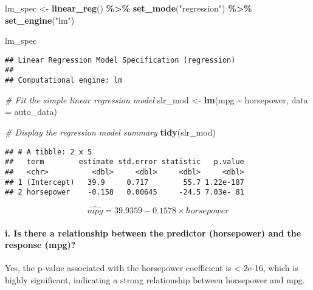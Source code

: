\documentclass[
]{article}
\newenvironment{Shaded}{\begin{snugshade}}{\end{snugshade}}
\newcommand{\AttributeTok}[1]{\textcolor[rgb]{0.13,0.29,0.53}{#1}}
\newcommand{\CommentTok}[1]{\textcolor[rgb]{0.56,0.35,0.01}{\textit{#1}}}
\newcommand{\FunctionTok}[1]{\textcolor[rgb]{0.13,0.29,0.53}{\textbf{#1}}}
\newcommand{\NormalTok}[1]{#1}
\newcommand{\OtherTok}[1]{\textcolor[rgb]{0.56,0.35,0.01}{#1}}
\newcommand{\SpecialCharTok}[1]{\textcolor[rgb]{0.81,0.36,0.00}{\textbf{#1}}}
\newcommand{\StringTok}[1]{\textcolor[rgb]{0.31,0.60,0.02}{#1}}
\begin{document}
\begin{Shaded}
\begin{Highlighting}[]
\NormalTok{lm\_spec }\OtherTok{\textless{}{-}} \FunctionTok{linear\_reg}\NormalTok{() }\SpecialCharTok{\%\textgreater{}\%}
  \FunctionTok{set\_mode}\NormalTok{(}\StringTok{"regression"}\NormalTok{) }\SpecialCharTok{\%\textgreater{}\%}
  \FunctionTok{set\_engine}\NormalTok{(}\StringTok{"lm"}\NormalTok{)}

\NormalTok{lm\_spec}
\end{Highlighting}
\end{Shaded}

\begin{verbatim}
## Linear Regression Model Specification (regression)
## 
## Computational engine: lm
\end{verbatim}

\begin{Shaded}
\begin{Highlighting}[]
\CommentTok{\# Fit the simple linear regression model}
\NormalTok{slr\_mod }\OtherTok{\textless{}{-}} \FunctionTok{lm}\NormalTok{(mpg }\SpecialCharTok{\textasciitilde{}}\NormalTok{ horsepower, }\AttributeTok{data =}\NormalTok{ auto\_data)}

\CommentTok{\# Display the regression model summary}
\FunctionTok{tidy}\NormalTok{(slr\_mod)}
\end{Highlighting}
\end{Shaded}

\begin{verbatim}
## # A tibble: 2 x 5
##   term        estimate std.error statistic   p.value
##   <chr>          <dbl>     <dbl>     <dbl>     <dbl>
## 1 (Intercept)   39.9     0.717        55.7 1.22e-187
## 2 horsepower    -0.158   0.00645     -24.5 7.03e- 81
\end{verbatim}

\[\widehat{mpg} = 39.9359 - 0.1578 \times horsepower\]

\paragraph{i. Is there a relationship between the predictor (horsepower)
and the response
(mpg)?}\label{i.-is-there-a-relationship-between-the-predictor-horsepower-and-the-response-mpg}

Yes, the p-value associated with the horsepower coefficient is
\textless{} 2e-16, which is highly significant, indicating a strong
relationship between horsepower and mpg.
\end{document}
